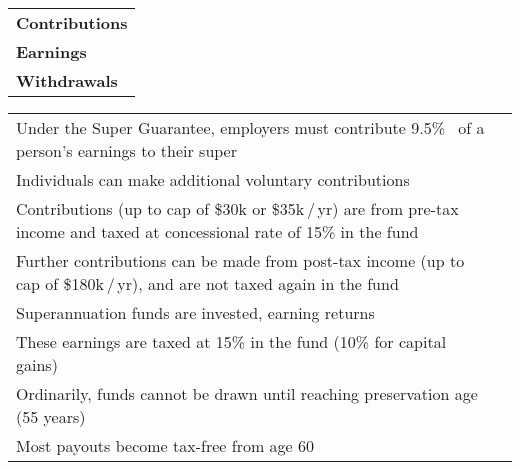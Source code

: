\documentclass[11pt,a4paper,twocolumn,landscape]{scrreprt}
\begin{document}
\begin{minipage}[t]{0.05\columnwidth}
\scriptsize
\begin{tabular}[t]{@{}>{\bfseries}p{\linewidth}@{}}
\\[2\baselineskip]
Contributions \\[13.5\baselineskip]
Earnings \\[5.5\baselineskip]
Withdrawals
\end{tabular}
\end{minipage}
\hfill
\begin{minipage}[t]{0.50\columnwidth}
\begin{mdframed}[style=Accumulation,frametitle=Accumulation]
\scriptsize
\begin{tabular}[t]{@{}>{\raggedright}p{\linewidth}@{}b{0pt}@{}}
				Under the Super Guarantee, employers must contribute 9.5\%\ %
				of a person's earnings to their super \\[0.5\baselineskip]
				Individuals can make additional voluntary
				contributions \\[0.5\baselineskip]
				Contributions (up to cap of \$30k or \$35k\,/\,yr)
				are from pre-tax income and taxed at
				concessional rate of 15\% in the fund \\[0.5\baselineskip]
				Further contributions can be made from
				post-tax income (up to cap of \$180k\,/\,yr),
				and are not taxed again in the fund \\[2\baselineskip]
Superannuation funds are invested, earning
returns \\[0.5\baselineskip]
These earnings are taxed at 15\% in the fund
(10\% for capital gains)  \\[2\baselineskip]
Ordinarily, funds cannot be drawn until reaching preservation age (55 years) \\[0.5\baselineskip]
Most payouts become tax-free from age 60 \\[2\baselineskip]
\end{tabular}
\end{mdframed}
\end{minipage}
\hfil
\end{document}
